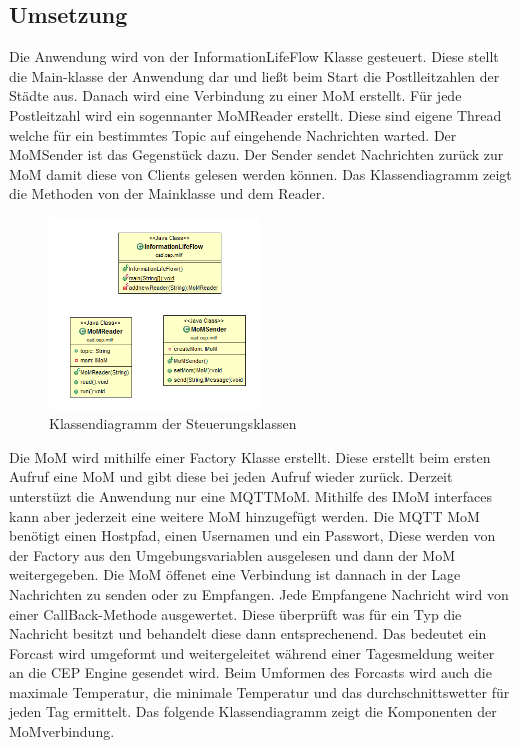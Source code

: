 \subsection{Umsetzung}
Die Anwendung wird von der InformationLifeFlow Klasse gesteuert. Diese stellt die Main-klasse der Anwendung dar und ließt beim Start die Postlleitzahlen der Städte aus. Danach wird eine Verbindung zu einer MoM erstellt. Für jede Postleitzahl wird ein sogennanter MoMReader erstellt. Diese sind eigene Thread welche für ein bestimmtes Topic auf eingehende Nachrichten warted. Der MoMSender ist das Gegenstück dazu. Der Sender sendet Nachrichten zurück zur MoM damit diese von Clients gelesen werden können. Das Klassendiagramm zeigt die Methoden von der Mainklasse und dem Reader.
\begin{figure}[htbp]
	\centering
	\includegraphics[width=0.5\textwidth]{Bilder/FlowAndReader.png}
	\caption{Klassendiagramm der Steuerungsklassen}
	\label{img:flowDiagramm}
\end{figure} 
Die MoM wird mithilfe einer Factory Klasse erstellt. Diese erstellt beim ersten Aufruf eine MoM und gibt diese bei jeden Aufruf wieder zurück. Derzeit unterstüzt die Anwendung nur eine MQTTMoM. Mithilfe des IMoM interfaces kann aber jederzeit eine weitere MoM hinzugefügt werden. Die MQTT MoM benötigt einen Hostpfad, einen Usernamen und ein Passwort, Diese werden von der Factory aus den Umgebungsvariablen ausgelesen und dann der MoM weitergegeben. Die MoM öffenet eine Verbindung ist dannach in der Lage Nachrichten zu senden oder zu Empfangen. Jede Empfangene Nachricht wird von einer CallBack-Methode ausgewertet. Diese überprüft was für ein Typ die Nachricht besitzt und behandelt diese dann entsprechenend. Das bedeutet ein Forcast wird umgeformt und weitergeleitet während einer Tagesmeldung weiter an die CEP Engine gesendet wird. Beim Umformen des Forcasts wird auch die maximale Temperatur, die minimale Temperatur und das durchschnittswetter für jeden Tag ermittelt. Das folgende Klassendiagramm zeigt die Komponenten der MoMverbindung.
